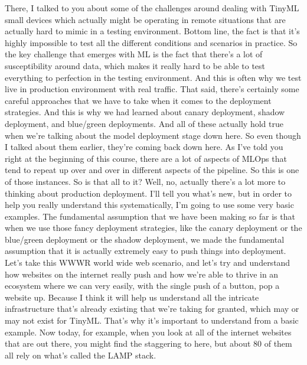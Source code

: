 {{{{{     There, I talked to you about some of the challenges
     around dealing with TinyML small devices which actually
     might be operating in remote situations that are actually
     hard to mimic in a testing environment.
     Bottom line, the fact is that it's highly impossible
     to test all the different conditions and scenarios in practice.
     So the key challenge that emerges with ML
     is the fact that there's a lot of susceptibility
     around data, which makes it really hard to be
     able to test everything to perfection in the testing environment.
     And this is often why we test live in production environment
     with real traffic.
     That said, there's certainly some careful approaches
     that we have to take when it comes to the deployment strategies.
     And this is why we had learned about canary deployment, shadow deployment,
     and blue/green deployments.
     And all of these actually hold true when we're talking about the model
     deployment stage down here.
     So even though I talked about them earlier, they're coming back down here.
     As I've told you right at the beginning of this course,
     there are a lot of aspects of MLOps that tend
     to repeat up over and over in different aspects of the pipeline.
     So this is one of those instances.
     So is that all to it?
     Well, no, actually there's a lot more to thinking about production deployment.
     I'll tell you what's new, but in order to help you really understand this
     systematically, I'm going to use some very basic examples.
     The fundamental assumption that we have been making so far
     is that when we use those fancy deployment
     strategies, like the canary deployment or the blue/green
     deployment or the shadow deployment, we made the fundamental assumption
     that it is actually extremely easy to push things into deployment.
     Let's take this WWWR world wide web scenario,
     and let's try and understand how websites on the internet really push
     and how we're able to thrive in an ecosystem
     where we can very easily, with the single push of a button,
     pop a website up.
     Because I think it will help us understand
     all the intricate infrastructure that's already existing that we're
     taking for granted, which may or may not exist for TinyML.
     That's why it's important to understand from a basic example.
     Now today, for example, when you look at all of the internet websites that
     are out there, you might find the staggering to here, but about 80%
     of them all rely on what's called the LAMP stack.
}}}}}
